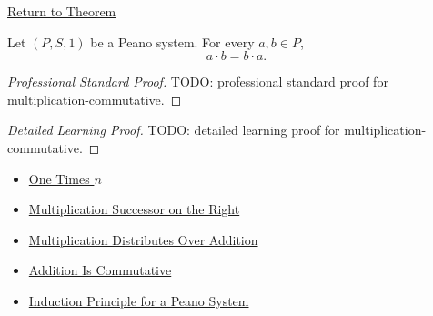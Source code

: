 \newpage
{}
\label{prf:multiplication-commutative}

\begin{remark*}[Return]
\hyperref[thm:multiplication-commutative]{Return to Theorem}
\end{remark*}

\begin{theorem*}
Let $(P,S,1)$ be a Peano system. For every $a,b \in P$,
\[
a \cdot b = b \cdot a.
\]
\end{theorem*}

\begin{proof}[Professional Standard Proof]
\LRAProofBodyStart
TODO: professional standard proof for multiplication-commutative.
\end{proof}

\begin{proof}[Detailed Learning Proof]
\LRAProofBodyStart
TODO: detailed learning proof for multiplication-commutative.
\end{proof}

\begin{remark*}
\end{remark*}

\begin{dependencies}
\begin{itemize}
  \item \hyperref[thm:one-times-n]{One Times $n$}
  \item \hyperref[thm:multiplication-successor-on-right]{Multiplication Successor on the Right}
  \item \hyperref[thm:multiplication-distributes-over-addition]{Multiplication Distributes Over Addition}
  \item \hyperref[thm:addition-commutative]{Addition Is Commutative}
  \item \hyperref[thm:induction-principle-for-peano-system]{Induction Principle for a Peano System}
\end{itemize}
\end{dependencies}

\clearpage
